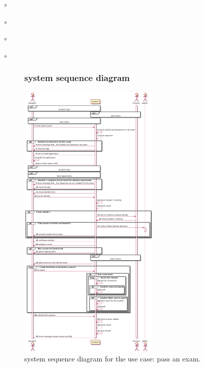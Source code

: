 \documentclass[]{uc2pfecaneva}
\begin{document}
\begin{list}{$\circ$}{}
\begin{list}{$\circ$}{}
\begin{list}{$\circ$}{}
\begin{list}{$\circ$}{}
    \begin{figure}[]
        \subsubsection{system sequence diagram}
        \centering
        \includegraphics[width=0.6\textwidth]{images/pass_exam}

        \caption{system sequence diagram for the use case: pass an exam.}
    \end{figure}
    \clearpage


    \begin{figure}[h]

\end{figure}
\end{list}
\end{list}
\end{list}
\end{list}
\end{document}
